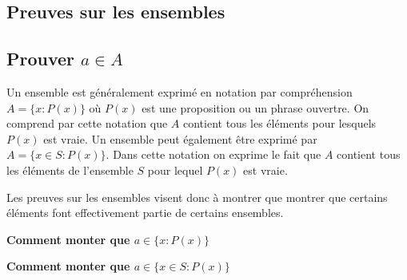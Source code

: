 \documentclass[16pt]{report}
\begin{document}
\begin{multicols*}{2}
            \chapter{Preuves sur les ensembles}
            

            \section{\textcolor{myp}{\textbf{Prouver $a \in A$}}}
            

            Un ensemble est généralement exprimé en notation par compréhension $A = \{x : P(x) \}$ où $P(x)$ est 
            une proposition ou un phrase ouvertre. On comprend par cette notation que $A$ contient tous les 
            éléments pour lesquels $P(x)$ est vraie. Un ensemble peut également être exprimé  par 
            $A = \{ x \in S : P(x)\}$. Dans cette notation on exprime le fait que $A$ contient tous les 
            éléments de l'ensemble $S$ pour lequel $P(x)$ est vraie.

            Les preuves sur les ensembles visent donc à montrer que montrer que certains éléments font effectivement 
            partie de certains ensembles.  

            \begin{center}
            \textbf{Comment monter que $a \in \{x : P(x)\}$}  
            \\
            \noindent{}

            \pagebreak
            \end{center}
            \begin{center}
            \textbf{Comment monter que $a \in \{x \in S : P(x)\}$}  
            \\
            \noindent{}
            \end{center}


\end{multicols*}
\end{document}
